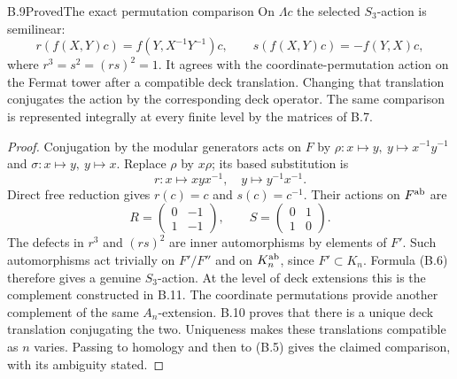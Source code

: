 \begin{statement}{B.9}{Proved}{The exact permutation comparison}
On \(\Lambda c\) the selected \(S_3\)-action is semilinear:
\[
 r(f(X,Y)c)=f(Y,X^{-1}Y^{-1})c,\qquad
 s(f(X,Y)c)=-f(Y,X)c,                                       \tag{B.6}
\]
where \(r^3=s^2=(rs)^2=1\). It agrees with the coordinate-permutation
action on the Fermat tower after a compatible deck translation.
Changing that translation conjugates the action by the corresponding
deck operator. The same comparison is represented integrally at every
finite level by the matrices of B.7.
\end{statement}
\begin{proof}
Conjugation by the modular generators acts on \(F\) by
\(\rho:x\mapsto y,\ y\mapsto x^{-1}y^{-1}\) and
\(\sigma:x\mapsto y,\ y\mapsto x\).
Replace \(\rho\) by \(x\rho\); its based substitution is
\[
 r:x\mapsto xyx^{-1},\quad y\mapsto y^{-1}x^{-1}.
\]
Direct free reduction gives \(r(c)=c\) and \(s(c)=c^{-1}\).
Their actions on \(F^{\rm ab}\) are
\[
 R=\begin{pmatrix}0&-1\\1&-1\end{pmatrix},\qquad
 S=\begin{pmatrix}0&1\\1&0\end{pmatrix}.
\]
The defects in \(r^3\) and \((rs)^2\) are inner automorphisms by
elements of \(F'\). Such automorphisms act trivially on \(F'/F''\)
and on \(K_n^{\rm ab}\), since \(F'\subset K_n\). Formula (B.6)
therefore gives a genuine \(S_3\)-action.
At the level of deck extensions this is the complement constructed
in B.11. The coordinate permutations provide another complement
of the same \(A_n\)-extension. B.10 proves that there is a unique
deck translation conjugating the two. Uniqueness makes these
translations compatible as \(n\) varies. Passing to homology and
then to (B.5) gives the claimed comparison, with its ambiguity stated.
\end{proof}


